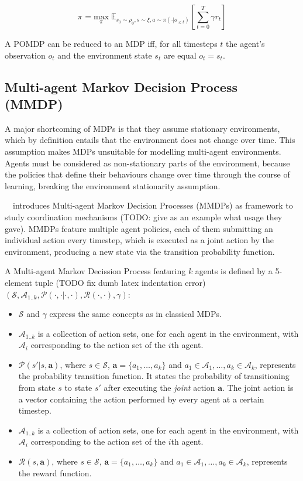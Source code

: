 \documentclass{../main.tex}{}
\begin{document}
        \begin{equation}
        \pi^{} = \underset{\pi}{\text{max}}\;  \mathbb{E}_{s_0 \sim \rho_0, s \sim \xi, a \sim \pi(\cdot | o_{\leq t})}[\sum_{t=0}^{T} \gamma r_t]
        \end{equation}

A POMDP can be reduced to an MDP iff, for all timesteps $t$ the agent's observation $o_t$ and the environment state $s_t$ are equal $o_t = s_t$.

\subsection{Multi-agent Markov Decision Process (MMDP)}

A major shortcoming of MDPs is that they assume stationary environments, which by definition entails that the environment does not change over time. This assumption makes MDPs unsuitable for modelling multi-agent environments. Agents must be considered as non-stationary parts of the environment, because the policies that define their behaviours change over time through the course of learning, breaking the environment stationarity assumption.

~\cite{Boutilier1996}~introduces Multi-agent Markov Decision Processes (MMDPs) as framework to study coordination mechanisms (TODO: give as an example what usage they gave). MMDPs feature multiple agent policies, each of them submitting an individual action every timestep, which is executed as a joint action by the environment, producing a new state via the transition probability function. 

A Multi-agent Markov Decission Process featuring $k$ agents is defined by a 5-element tuple (TODO fix dumb latex indentation error) $(\mathcal{S}, \mathcal{A}_{1..k}, \mathcal{P}(\cdot, \cdot | \cdot, \cdot), \mathcal{R}(\cdot, \cdot), \gamma)$:
\begin{itemize}
    \item $\mathcal{S}$ and $\gamma$ express the same concepts as in classical MDPs.
    \item $\mathcal{A}_{1..k}$ is a collection of action sets, one for each agent in the environment, with $\mathcal{A}_i$ corresponding to the action set of the $i$th agent.
    \item $\mathcal{P}(s' | s, \mathbf{a})$, where $s \in \mathcal{S}$, $\mathbf{a} = \{a_1,\ldots,a_k\}$ and $a_1 \in \mathcal{A}_1, \ldots, a_k \in \mathcal{A}_k$, represents the probability transition function. It states the probability of transitioning from state $s$ to state $s'$ after executing the \textit{joint} action $\mathbf{a}$. The joint action is a vector containing the action performed by every agent at a certain timestep.    \item $\mathcal{A}_{1..k}$ is a collection of action sets, one for each agent in the environment, with $\mathcal{A}_i$ corresponding to the action set of the $i$th agent.
    \item $\mathcal{R}(s, \mathbf{a})$, where $s \in \mathcal{S}$, $\mathbf{a} = \{a_1,\ldots,a_k\}$ and $a_1 \in \mathcal{A}_1, \ldots, a_k \in \mathcal{A}_k$, represents the reward function.
\end{itemize}
\end{document}
